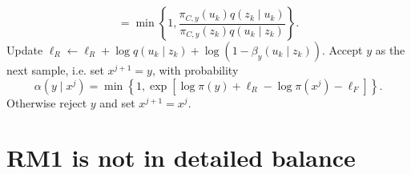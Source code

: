 \documentclass[12pt]{article}
\theoremstyle{definition}
\theoremstyle{remark}
\theoremstyle{plain}
\begin{document}
\begin{algorithm}[H]
\begin{algorithmic}[1]
\[                  =
                  \min\left\{
                  1,
                  \frac{
                      \pi_{C,y}(u_k)q(z_k\mid u_k)
                  }{
                      \pi_{C,y}(z_k)q(u_k\mid z_k)
                  }
                  \right\}.
              \]
              \State Update $\ell_R \leftarrow \ell_R + \log q(u_k\mid z_k) + \log\left(1-\beta_y(u_k\mid z_k)\right)$.
          \EndIf
      \EndFor
      \State Accept $y$ as the next sample, i.e. set $x^{j+1}=y$, with probability
      \[
          \alpha(y\mid x^j)
          =
          \min\left\{
          1,
          \exp\left[
              \log\pi(y)+\ell_R-\log\pi(x^j)-\ell_F
          \right]
          \right\}.
      \]
      \State Otherwise reject $y$ and set $x^{j+1}=x^j$.
  \EndFor
  \end{algorithmic}
\end{algorithm}


\section{RM1 is not in detailed balance}
\end{document}
